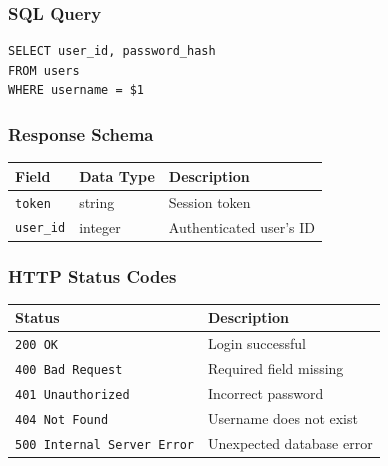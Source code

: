 \documentclass[11pt]{article}
\begin{document}
\subsubsection*{SQL Query}
\begin{lstlisting}[style=sql,basicstyle=\ttfamily\scriptsize]
SELECT user_id, password_hash
FROM users
WHERE username = $1
\end{lstlisting}

\subsubsection*{Response Schema}

\begin{center}
\small
\begin{tabular}{l l p{7cm}}
\toprule
\textbf{Field} & \textbf{Data Type} & \textbf{Description} \\
\midrule
\texttt{token}    & string  & Session token \\
\texttt{user\_id} & integer & Authenticated user's ID \\
\bottomrule
\end{tabular}
\end{center}

\subsubsection*{HTTP Status Codes}

\begin{center}
\small
\begin{tabular}{l p{8cm}}
\toprule
\textbf{Status} & \textbf{Description} \\
\midrule
\texttt{200 OK} & Login successful \\
\texttt{400 Bad Request} & Required field missing \\
\texttt{401 Unauthorized} & Incorrect password \\
\texttt{404 Not Found} & Username does not exist \\
\texttt{500 Internal Server Error} & Unexpected database error \\
\bottomrule
\end{tabular}
\end{center}
\end{document}
